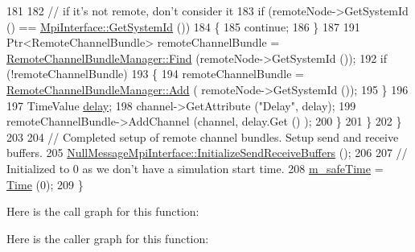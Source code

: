 \begin{DoxyCode}
181 
182               \textcolor{comment}{// if it's not remote, don't consider it}
183               \textcolor{keywordflow}{if} (remoteNode->GetSystemId () == \hyperlink{classns3_1_1MpiInterface_a7f1f671b55948fb1c8f7eb54f22a9619}{MpiInterface::GetSystemId} ())
184                 \{
185                   \textcolor{keywordflow}{continue};
186                 \}
187 
191               Ptr<RemoteChannelBundle> remoteChannelBundle = 
      \hyperlink{classns3_1_1RemoteChannelBundleManager_a143cfdce189ed68cc0917255ef0b849f}{RemoteChannelBundleManager::Find} (remoteNode->GetSystemId ());
192               \textcolor{keywordflow}{if} (!remoteChannelBundle)
193                 \{
194                   remoteChannelBundle = \hyperlink{classns3_1_1RemoteChannelBundleManager_a5cd184a98e821db4998273bd88ba9c4a}{RemoteChannelBundleManager::Add} (
      remoteNode->GetSystemId ());
195                 \}
196 
197               TimeValue \hyperlink{lte_2model_2fading-traces_2fading__trace__generator_8m_a7964e6aa8f61a9d28973c8267a606ad8}{delay};
198               channel->GetAttribute (\textcolor{stringliteral}{"Delay"}, delay);
199               remoteChannelBundle->AddChannel (channel, delay.Get () );
200             \}
201         \}
202     \}
203 
204   \textcolor{comment}{// Completed setup of remote channel bundles.  Setup send and receive buffers.}
205   \hyperlink{classns3_1_1NullMessageMpiInterface_ab678abc12a3e689d5eeeaee743b51c11}{NullMessageMpiInterface::InitializeSendReceiveBuffers}
       ();
206 
207   \textcolor{comment}{// Initialized to 0 as we don't have a simulation start time.}
208   \hyperlink{classns3_1_1NullMessageSimulatorImpl_a4c2c75ce1bb2369f04c678898fc83711}{m\_safeTime} = \hyperlink{namespacens3_1_1TracedValueCallback_a7ffd3e7c142ffe7c8a1d2db9b8de38ec}{Time} (0);
209 \}
\end{DoxyCode}


Here is the call graph for this function\+:




Here is the caller graph for this function\+:


